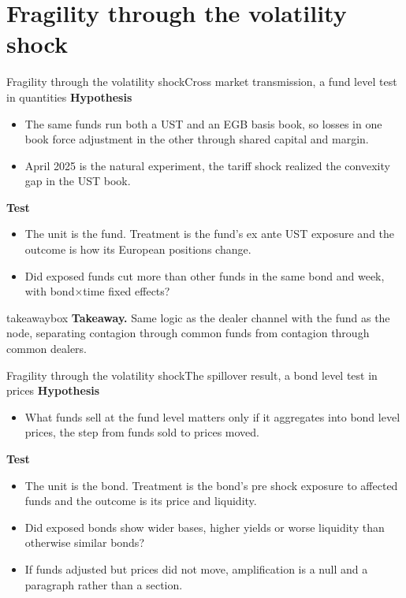 \documentclass[aspectratio=169,11pt]{beamer}
\newcommand{\takeaway}[1]{%
  \begin{beamercolorbox}[sep=0.6em,wd=\textwidth]{takeawaybox}
    \textbf{Takeaway.} #1
  \end{beamercolorbox}}
\begin{document}
\section{Fragility through the volatility shock}
\begin{frame}{Fragility through the volatility shock}{Cross market transmission, a fund level test in quantities}
  \textbf{Hypothesis}
  \begin{itemize}
    \item The same funds run both a UST and an EGB basis book, so losses in one book force adjustment in the other through shared capital and margin.
    \item April 2025 is the natural experiment, the tariff shock realized the convexity gap in the UST book.
  \end{itemize}
  \medskip
  \textbf{Test}
  \begin{itemize}
    \item The unit is the fund. Treatment is the fund's ex ante UST exposure and the outcome is how its European positions change.
    \item Did exposed funds cut more than other funds in the same bond and week, with bond$\times$time fixed effects?
  \end{itemize}
  \medskip
  \takeaway{Same logic as the dealer channel with the fund as the node, separating contagion through common funds from contagion through common dealers.}
\end{frame}

\begin{frame}{Fragility through the volatility shock}{The spillover result, a bond level test in prices}
  \textbf{Hypothesis}
  \begin{itemize}
    \item What funds sell at the fund level matters only if it aggregates into bond level prices, the step from funds sold to prices moved.
  \end{itemize}
  \medskip
  \textbf{Test}
  \begin{itemize}
    \item The unit is the bond. Treatment is the bond's pre shock exposure to affected funds and the outcome is its price and liquidity.
    \item Did exposed bonds show wider bases, higher yields or worse liquidity than otherwise similar bonds?
    \item If funds adjusted but prices did not move, amplification is a null and a paragraph rather than a section.
  \end{itemize}
\end{frame}
\end{document}
